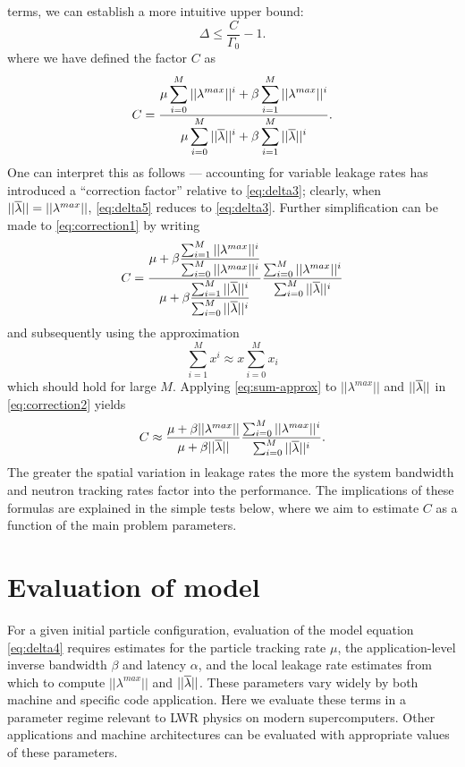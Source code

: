 terms, we can establish a more intuitive upper bound:
\begin{equation}
  \label{eq:delta5}
  \Delta \le \frac{C}{\Gamma_0} - 1.
\end{equation}
where we have defined the factor $C$ as
\begin{equation}
  \label{eq:correction1}
  C = \frac{\displaystyle \mu \sum_{i=0}^M ||\lambda^{max}||^i + \beta
    \sum_{i=1}^M ||\lambda^{max}||^i}{\displaystyle \mu \sum_{i=0}^M ||\overline{\lambda}||^i
    + \beta\sum_{i=1}^M ||\overline{\lambda}||^i}.
\end{equation}
One can interpret this as follows --- accounting for variable leakage rates has
introduced a ``correction factor'' relative to \eqref{eq:delta3}; clearly, when
$||\overline{\lambda}|| = ||\lambda^{max}||$, \eqref{eq:delta5} reduces to
\eqref{eq:delta3}. Further simplification can be made to \eqref{eq:correction1}
by writing
\begin{equation}
  \label{eq:correction2}
  C = \frac{\displaystyle \mu + \beta \frac{\sum_{i=1}^M
      ||\lambda^{max}||^i}{\sum_{i=0}^M ||\lambda^{max}||^i}}{\displaystyle \mu
    + \beta \frac{\sum_{i=1}^M ||\overline{\lambda}||^i}{\sum_{i=0}^M ||\overline{\lambda}||^i}}
  \frac{\sum_{i=0}^M ||\lambda^{max}||^i}{\sum_{i=0}^M ||\overline{\lambda}||^i}
\end{equation}
and subsequently using the approximation
\begin{equation}
  \label{eq:sum-approx}
  \sum_{i=1}^M x^i \approx x \sum_{i=0}^M x_i
\end{equation}
which should hold for large $M$. Applying \eqref{eq:sum-approx} to
$||\lambda^{max}||$ and $||\overline{\lambda}||$ in \eqref{eq:correction2} yields
\begin{equation}
  \label{eq:correction3}
  C \approx \frac{\mu + \beta ||\lambda^{max}||}{\mu + \beta ||\overline{\lambda}||}
  \frac{\sum_{i=0}^M ||\lambda^{max}||^i}{\sum_{i=0}^M ||\overline{\lambda}||^i}.
\end{equation}
The greater the spatial variation in leakage rates the more the system bandwidth
and neutron tracking rates factor into the performance. The implications of
these formulas are explained in the simple tests below, where we aim to estimate
$C$ as a function of the main problem parameters.

\section{Evaluation of model}
\label{sec:domain-decomp-evaluation}

For a given initial particle configuration, evaluation of the model equation
\eqref{eq:delta4} requires estimates for the particle tracking rate $\mu$, the
application-level inverse bandwidth $\beta$ and latency $\alpha$, and the local
leakage rate estimates from which to compute $||\lambda^{max}||$ and
$||\overline{\lambda}||$. These parameters vary widely by both machine and specific code
application. Here we evaluate these terms in a parameter regime relevant to LWR
physics on modern supercomputers. Other applications and machine architectures
can be evaluated with appropriate values of these parameters.

